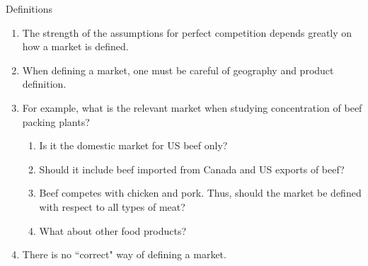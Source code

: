 \documentclass[table,xcolor=pdftex,dvipsnames]{beamer}\usepackage[]{graphicx}\usepackage[]{color}
\begin{document}
\begin{frame}{Definitions}
\begin{enumerate}[label=\textbullet]
  \item The strength of the assumptions for perfect competition depends greatly on how a market is defined.
  \item When defining a market, one must be careful of geography and product definition.
  \item For example, what is the relevant market when studying concentration of beef packing plants?
       \begin{enumerate}[label=-]
          \item Is it the domestic market for US beef only?
          \item Should it include beef imported from Canada and US exports of beef?
          \item Beef competes with chicken and pork. Thus, should the market be defined with respect to all types of meat?
          \item What about other food products?
      \end{enumerate}
  \item There is no ``correct" way of defining a market.
\end{enumerate}
\end{frame}

\end{document}
